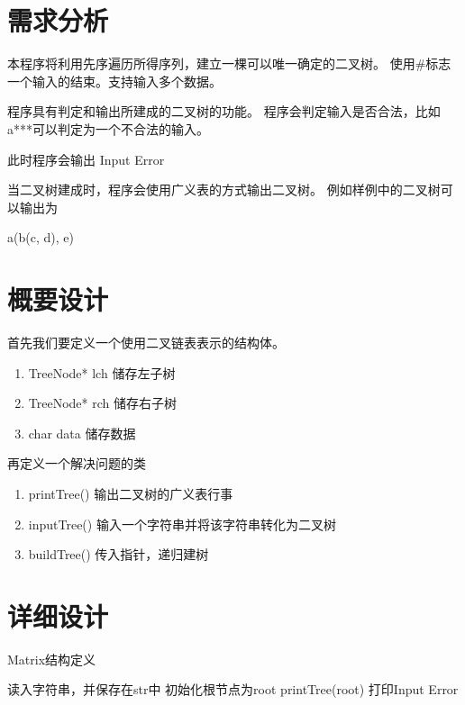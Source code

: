 \section{需求分析}
   本程序将利用先序遍历所得序列，建立一棵可以唯一确定的二叉树。
   使用\#标志一个输入的结束。支持输入多个数据。


   程序具有判定和输出所建成的二叉树的功能。
   程序会判定输入是否合法，比如a***可以判定为一个不合法的输入。


   此时程序会输出 Input Error


   当二叉树建成时，程序会使用广义表的方式输出二叉树。
   例如样例中的二叉树可以输出为


   a(b(c, d), e)
   
\section{概要设计}
   首先我们要定义一个使用二叉链表表示的结构体。
   \begin{enumerate}
      \item TreeNode* lch  储存左子树
      \item TreeNode* rch  储存右子树
      \item char  data  储存数据
   \end{enumerate}


   再定义一个解决问题的类
   \begin{enumerate}
      \item printTree() 输出二叉树的广义表行事
      \item inputTree() 输入一个字符串并将该字符串转化为二叉树
      \item buildTree() 传入指针，递归建树
   \end{enumerate}

\newpage

\section{详细设计}

\begin{algorithm}[htb] 
   \caption{ Matrix结构定义 } 
   \label{alg:Framwork} 
   \begin{algorithmic}[1]
         \State 读入字符串，并保存在str中
         \State 初始化根节点为root
            \State printTree(root)
         \Else
            \State 打印Input Error
         \EndIf
      \EndFunction
   \end{algorithmic} 
\end{algorithm}

